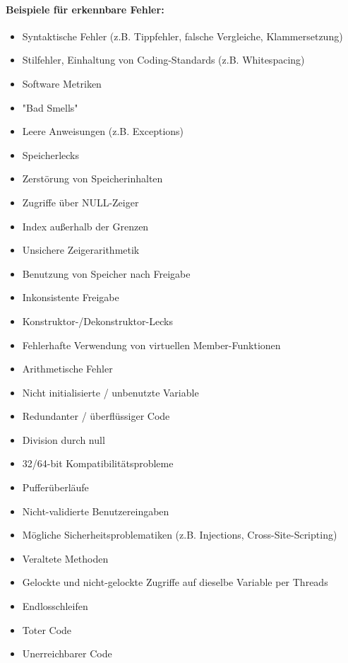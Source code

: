 \paragraph{Beispiele für erkennbare Fehler:}
\begin{itemize}
\item Syntaktische Fehler (z.B. Tippfehler, falsche Vergleiche, Klammersetzung)
\item Stilfehler, Einhaltung von Coding-Standards (z.B. Whitespacing)
\item Software Metriken
\item "Bad Smells"
\item Leere Anweisungen (z.B. Exceptions)
\item Speicherlecks
\item Zerstörung von Speicherinhalten
\item Zugriffe über NULL-Zeiger
\item Index außerhalb der Grenzen
\item Unsichere Zeigerarithmetik
\item Benutzung von Speicher nach Freigabe
\item Inkonsistente Freigabe
\item Konstruktor-/Dekonstruktor-Lecks
\item Fehlerhafte Verwendung von virtuellen Member-Funktionen
\item Arithmetische Fehler
\item Nicht initialisierte / unbenutzte Variable
\item Redundanter / überflüssiger Code
\item Division durch null
\item 32/64-bit Kompatibilitätsprobleme
\item Pufferüberläufe
\item Nicht-validierte Benutzereingaben
\item Mögliche Sicherheitsproblematiken (z.B. Injections, Cross-Site-Scripting)
\item Veraltete Methoden
\item Gelockte und nicht-gelockte Zugriffe auf dieselbe Variable per Threads
\item Endlosschleifen
\item Toter Code
\item Unerreichbarer Code
\end{itemize}
